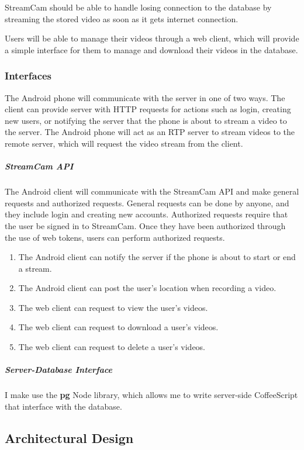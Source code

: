 \documentclass[11pt,a4paper,titlepage]{article}
\begin{document}
StreamCam should be able to handle losing connection to the database by streaming the stored video as soon as it gets internet connection. 

Users will be able to manage their videos through a web client, which will provide a simple interface for them to manage and download their videos in the database. 

\subsubsection{Interfaces}

The Android phone will communicate with the server in one of two ways. The client can provide server with HTTP requests for actions such as login, creating new users, or notifying the server that the phone is about to stream a video to the server. The Android phone will act as an RTP server to stream videos to the  remote server, which will request the video stream from the client. 

\subparagraph{StreamCam API\\}

The Android client will communicate with the StreamCam API and make general requests and authorized requests. General requests can be done by anyone, and they include login and creating new accounts. Authorized requests require that the user be signed in to StreamCam. Once they have been authorized through the use of web tokens, users can perform authorized requests. 
\begin{enumerate}
  \item The Android client can notify the server if the phone is about to start or end a stream.
  \item The Android client can post the user's location when recording a video. 
  \item The web client can request to view the user's videos.
  \item The web client can request to download a user's videos.
  \item The web client can request to delete a user's videos.
\end{enumerate}

\subparagraph{Server-Database Interface\\}

I make use the \textbf{pg} Node library, which allows me to write server-side CoffeeScript that interface with the database. 

\subsection{Architectural Design}
\end{document}
